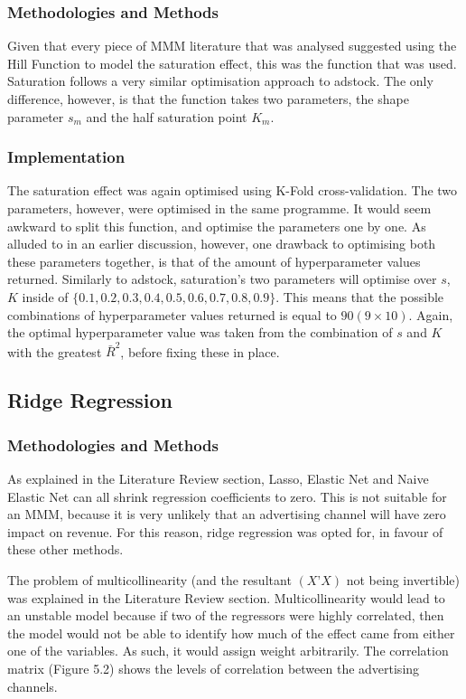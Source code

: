 \documentclass[11pt, a4paper]{article}
\begin{document}
\subsubsection{Methodologies and Methods}

Given that every piece of MMM literature that was analysed suggested using the Hill Function to model the saturation effect, this was the function that was used. Saturation follows a very similar optimisation approach to adstock. The only difference, however, is that the function takes two parameters, the shape parameter $s_{m}$ and the half saturation point $K_{m}$. 

\subsubsection{Implementation}

The saturation effect was again optimised using K-Fold cross-validation. The two parameters, however, were optimised in the same programme. It would seem awkward to split this function, and optimise the parameters one by one. As alluded to in an earlier discussion, however, one drawback to optimising both these parameters together, is that of the amount of hyperparameter values returned. Similarly to adstock, saturation’s two parameters will optimise over $s$, $K$ inside of $\{0.1, 0.2, 0.3, 0.4, 0.5, 0.6, 0.7, 0.8, 0.9\}$. This means that the possible combinations of hyperparameter values returned is equal to $90 (9 \times 10)$. Again, the optimal hyperparameter value was taken from the combination of $s$ and $K$ with the greatest $\bar{R}^2
$, before fixing these in place. 

\subsection{Ridge Regression}

\subsubsection{Methodologies and Methods}

As explained in the Literature Review section, Lasso, Elastic Net and Naive Elastic Net can all shrink regression coefficients to zero. This is not suitable for an MMM, because it is very unlikely that an advertising channel will have zero impact on revenue. For this reason, ridge regression was opted for, in favour of these other methods. 

The problem of multicollinearity (and the resultant $(X’X)$ not being invertible) was explained in the Literature Review section. Multicollinearity would lead to an unstable model because if two of the regressors were highly correlated, then the model would not be able to identify how much of the effect came from either one of the variables. As such, it would assign weight arbitrarily. The correlation matrix (Figure 5.2) shows the levels of correlation between the advertising channels.
\end{document}
